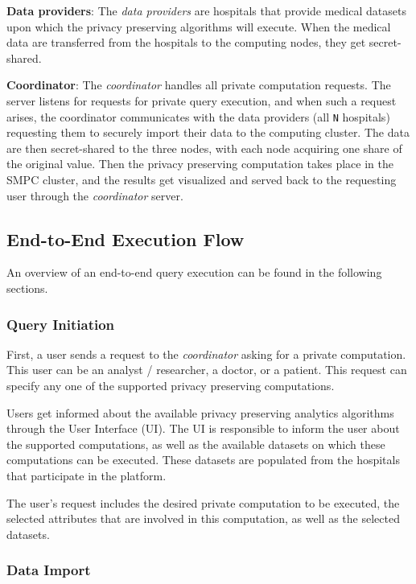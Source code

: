 \textbf{Data providers}: The \textit{data providers} are hospitals that provide medical datasets upon which the privacy preserving algorithms will execute.
When the medical data are transferred from the hospitals to the computing nodes, they get secret\hyp shared.


\textbf{Coordinator}: The \textit{coordinator} handles all private computation requests.
The server listens for requests for private query execution, and when such a request arises, the coordinator communicates with the data providers (all \texttt{N} hospitals) requesting them to securely import their data to the computing cluster.
The data are then secret\hyp shared to the three nodes, with each node acquiring one share of the original value.
Then the privacy preserving computation takes place in the SMPC cluster, and the results get visualized and served back to the requesting user through the \textit{coordinator} server.


\subsection{End-to-End Execution Flow}\label{ss:end-to-end-execution-flow}

An overview of an end\hyp to\hyp end query execution can be found in the following sections.

\subsubsection{Query Initiation}\label{sss:query-initiation}
First, a user sends a request to the \textit{coordinator} asking for a private computation.
This user can be an analyst / researcher, a doctor, or a patient.
This request can specify any one of the supported privacy preserving computations.

Users get informed about the available privacy preserving analytics algorithms through the  User Interface (UI).
The UI is responsible to inform the user about the supported computations, as well as the available datasets on which these computations can be executed.
These datasets are populated from the hospitals that participate in the platform.

The user's request includes the desired private computation to be executed, the selected attributes that are involved in this computation, as well as the selected datasets.

\subsubsection{Data Import}\label{sss:data-import}

